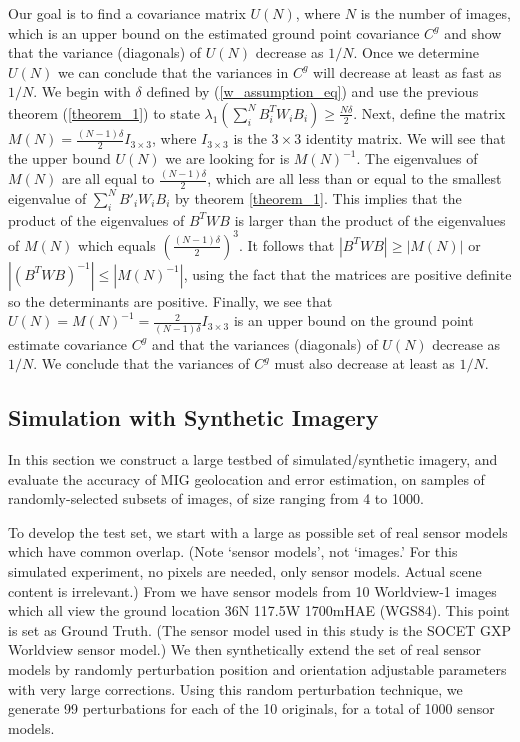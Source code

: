 \documentclass[10pt]{amsart}
\begin{document}
Our goal is to find a covariance matrix $U(N)$, where $N$ is the number of images, which is an upper bound on the 
estimated ground point covariance $C^g$ and show that the variance (diagonals) of
$U(N)$ decrease as $1/N$. Once we determine $U(N)$ we can conclude that the variances
in $C^g$ will decrease at least as fast as $1/N$.  We begin with $\delta$ defined by (\ref{w_assumption_eq})
and use the previous theorem (\ref{theorem_1}) to state $\lambda_1(\sum_i^NB_i^TW_iB_i) \geq \frac{N\delta}{2}$.  
Next, define the matrix $M(N) = \frac{(N-1)\delta}{2}I_{3 \times 3}$,
where $I_{3\times 3}$ is the $3 \times 3$ identity matrix.
We will see that the upper bound $U(N)$ we are looking for is $M(N)^{-1}$.
The eigenvalues of $M(N)$ are all equal to $\frac{(N-1)\delta}{2}$,
which are all less than or equal to the smallest eigenvalue of $\sum^N_i B'_iW_iB_i$ by theorem \ref{theorem_1}.
This implies that the product of the eigenvalues of $B^TWB$ is larger than the product
of the eigenvalues of $M(N)$ which equals $(\frac{(N - 1)\delta}{2})^3$.  It follows that
$|B^TWB| \geq |M(N)|$ or $|(B^TWB)^{-1}| \leq |M(N)^{-1}|$, using the fact that
the matrices are positive definite so the determinants are positive. Finally, we see that
$U(N) = M(N)^{-1} = \frac{2}{(N-1)\delta}I_{3\times 3}$ is an upper bound on the 
ground point estimate covariance $C^g$ and that the variances (diagonals) of $U(N)$ 
decrease as $1/N$.  We conclude that the variances of $C^g$ must also decrease at 
least as $1/N$.

\subsection{\label{simulation}Simulation with Synthetic Imagery}
In this section we construct a large testbed of simulated/\-syn\-the\-tic imagery, and
evaluate the accuracy of MIG geolocation and error estimation, on samples of
randomly-selected subsets of images, of size ranging from 4 to 1000.

To develop the test set, we start with a large as possible set of real sensor
models which have common overlap. (Note `sensor models', not `images.' For
this simulated experiment, no pixels are needed, only sensor models. Actual
scene content is irrelevant.)  From \cite{MIN} we have sensor models from 10
Worldview-1 images which all view the ground location 36N 117.5W 1700mHAE
(WGS84). This point is set as Ground Truth. (The sensor model used in this study
is the SOCET GXP \cite{SGXP} Worldview sensor model.) We then synthetically
extend the set of real sensor models by randomly perturbation position and
orientation adjustable parameters with very large corrections. Using this random
perturbation technique, we generate 99 perturbations for each of the 10
originals, for a total of 1000 sensor models.
\end{document}
